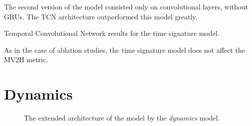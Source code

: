 The second version of the model consisted only on convolutional layers, without GRUs. The TCN architecture outperformed this model greatly.

\begin{table}[ht!]
\centering

\caption[Temporal Convolutional Network results for the time signature model.]{Temporal Convolutional Network results for the time signature model.}
\label{time_signature_tcn}
\end{table}

As in the case of ablation studies, the time signature model does not affect the MV2H metric.

\section{Dynamics}

\missing

\begin{figure}[!ht]
\centering

\caption[The extended architecture of the model.]{The extended architecture of the model by the \emph{dynamics} model.}
\end{figure}